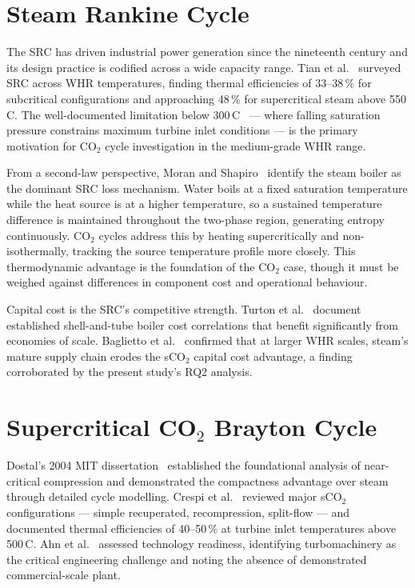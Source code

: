 \documentclass[12pt,a4paper]{report}
\begin{document}
\section{Steam Rankine Cycle}
\label{sec:lit_src}

The SRC has driven industrial power generation since the nineteenth century
and its design practice is codified across a wide capacity range. Tian et
al.~\cite{Tian2022} surveyed SRC across WHR temperatures, finding thermal
efficiencies of 33--38\,\% for subcritical configurations and approaching
48\,\% for supercritical steam above 550\,\textdegree C. The well-documented
limitation below 300\,\textdegree C~\cite{Tchanche2011} --- where falling
saturation pressure constrains maximum turbine inlet conditions --- is the
primary motivation for CO$_2$ cycle investigation in the medium-grade
WHR range.

From a second-law perspective, Moran and Shapiro~\cite{Moran2018} identify
the steam boiler as the dominant SRC loss mechanism. Water boils at a fixed
saturation temperature while the heat source is at a higher temperature, so
a sustained temperature difference is maintained throughout the two-phase
region, generating entropy continuously. CO$_2$ cycles address this by
heating supercritically and non-isothermally, tracking the source temperature
profile more closely. This thermodynamic advantage is the foundation of the
CO$_2$ case, though it must be weighed against differences in component cost
and operational behaviour.

Capital cost is the SRC's competitive strength. Turton et
al.~\cite{Turton2012} document established shell-and-tube boiler cost
correlations that benefit significantly from economies of scale. Baglietto et
al.~\cite{Baglietto2023} confirmed that at larger WHR scales, steam's mature
supply chain erodes the sCO$_2$ capital cost advantage, a finding corroborated
by the present study's RQ2 analysis.

\section{Supercritical CO$_2$ Brayton Cycle}
\label{sec:lit_sco2}

Dostal's 2004 MIT dissertation~\cite{Dostal2004} established the foundational
analysis of near-critical compression and demonstrated the compactness
advantage over steam through detailed cycle modelling. Crespi et
al.~\cite{Crespi2017} reviewed major sCO$_2$ configurations --- simple
recuperated, recompression, split-flow --- and documented thermal efficiencies
of 40--50\,\% at turbine inlet temperatures above 500\,\textdegree C. Ahn et
al.~\cite{Ahn2015} assessed technology readiness, identifying turbomachinery
as the critical engineering challenge and noting the absence of demonstrated
commercial-scale plant.
\end{document}
